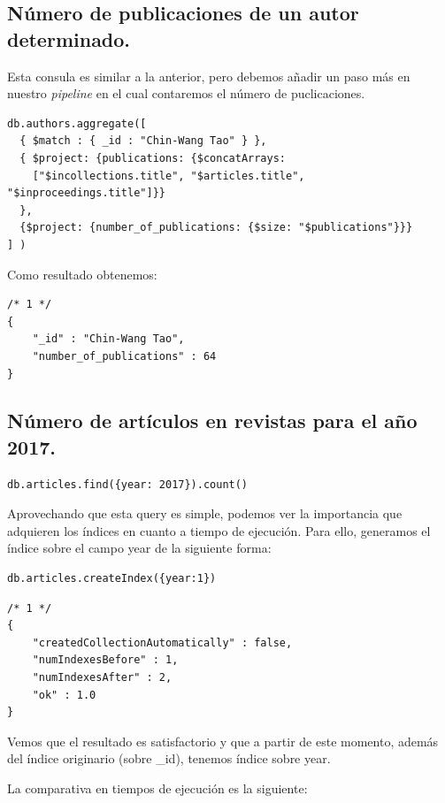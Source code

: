 \subsection{Número de publicaciones de un autor determinado.}

Esta consula es similar a la anterior, pero debemos añadir un paso más en nuestro \textit{pipeline} en el cual contaremos el número de puclicaciones.

\begin{verbatim}
db.authors.aggregate([
  { $match : { _id : "Chin-Wang Tao" } }, 
  { $project: {publications: {$concatArrays: 
    ["$incollections.title", "$articles.title", "$inproceedings.title"]}}
  },
  {$project: {number_of_publications: {$size: "$publications"}}}
] )
\end{verbatim}


Como resultado obtenemos:

\begin{verbatim}
/* 1 */
{
    "_id" : "Chin-Wang Tao",
    "number_of_publications" : 64
}
\end{verbatim}

\subsection{Número de artículos en revistas para el año 2017.}

\begin{verbatim}
db.articles.find({year: 2017}).count()
\end{verbatim}

Aprovechando que esta query es simple, podemos ver la importancia que adquieren los índices en cuanto a tiempo de ejecución. Para ello, generamos el índice sobre el campo year de la siguiente forma:

\begin{verbatim}
db.articles.createIndex({year:1})
\end{verbatim}


\begin{verbatim}
/* 1 */
{
    "createdCollectionAutomatically" : false,
    "numIndexesBefore" : 1,
    "numIndexesAfter" : 2,
    "ok" : 1.0
}
\end{verbatim}

Vemos que el resultado es satisfactorio y que a partir de este momento, además del índice originario (sobre \_id), tenemos índice sobre year.

La comparativa en tiempos de ejecución es la siguiente:

